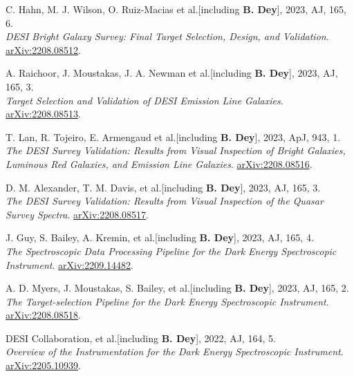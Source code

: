 \begin{etaremune}[leftmargin=40pt,labelsep=10pt]
 \item C. Hahn, M. J. Wilson, O. Ruiz-Macias et al.[including \textbf{B. Dey}], 2023, AJ, 165, 6. \\ \textrm{\textit{DESI Bright Galaxy Survey: Final Target Selection, Design, and Validation}}. \href{https://arxiv.org/abs/2208.08512}{arXiv:2208.08512}.
 
 \item A. Raichoor, J. Moustakas, J. A. Newman et al.[including \textbf{B. Dey}], 2023, AJ, 165, 3. \\ \textrm{\textit{Target Selection and Validation of DESI Emission Line Galaxies}}. \href{https://arxiv.org/abs/2208.08513}{arXiv:2208.08513}.
 
 \item T. Lan, R. Tojeiro, E. Armengaud et al.[including \textbf{B. Dey}], 2023, ApJ, 943, 1. \\ \textrm{\textit{The DESI Survey Validation: Results from Visual Inspection of Bright Galaxies, Luminous Red Galaxies, and Emission Line Galaxies}}. \href{https://arxiv.org/abs/2208.08516}{arXiv:2208.08516}.
 
 \item D. M. Alexander, T. M. Davis, et al.[including \textbf{B. Dey}], 2023, AJ, 165, 3. \\ \textrm{\textit{The DESI Survey Validation: Results from Visual Inspection of the Quasar Survey Spectra}}. \href{https://arxiv.org/abs/2208.08517}{arXiv:2208.08517}.
 
 \item J. Guy, S. Bailey, A. Kremin, et al.[including \textbf{B. Dey}], 2023, AJ, 165, 4. \\ \textrm{\textit{The Spectroscopic Data Processing Pipeline for the Dark Energy Spectroscopic Instrument}}. \href{https://arxiv.org/abs/2209.14482}{arXiv:2209.14482}.
 
 \item A. D. Myers, J. Moustakas, S. Bailey, et al.[including \textbf{B. Dey}], 2023, AJ, 165, 2. \\ \textrm{\textit{The Target-selection Pipeline for the Dark Energy Spectroscopic Instrument}}. \href{https://arxiv.org/abs/2208.08518}{arXiv:2208.08518}.
 
 \item DESI Collaboration, et al.[including \textbf{B. Dey}], 2022, AJ, 164, 5. \\ \textrm{\textit{Overview of the Instrumentation for the Dark Energy Spectroscopic Instrument}}. \href{https://arxiv.org/abs/2205.10939}{arXiv:2205.10939}.
 

\end{etaremune}
